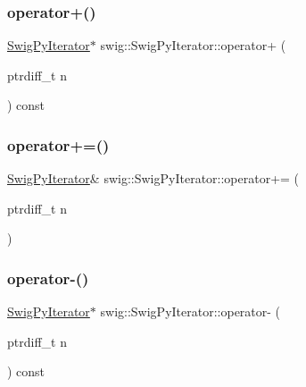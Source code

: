 \subsubsection{\texorpdfstring{operator+()}{operator+()}}
{\footnotesize\ttfamily \hyperlink{structswig_1_1_swig_py_iterator}{Swig\+Py\+Iterator}$\ast$ swig\+::\+Swig\+Py\+Iterator\+::operator+ (\begin{DoxyParamCaption}\item[{ptrdiff\+\_\+t}]{n }\end{DoxyParamCaption}) const\hspace{0.3cm}{\ttfamily [inline]}}

\mbox{\label{structswig_1_1_swig_py_iterator_a81afed8a7dfb6c44a8d31069e44aabc2}} 
\subsubsection{\texorpdfstring{operator+=()}{operator+=()}}
{\footnotesize\ttfamily \hyperlink{structswig_1_1_swig_py_iterator}{Swig\+Py\+Iterator}\& swig\+::\+Swig\+Py\+Iterator\+::operator+= (\begin{DoxyParamCaption}\item[{ptrdiff\+\_\+t}]{n }\end{DoxyParamCaption})\hspace{0.3cm}{\ttfamily [inline]}}

\mbox{\label{structswig_1_1_swig_py_iterator_af41383899796677955b31807fd7ccfd7}} 
\subsubsection{\texorpdfstring{operator-\/()}{operator-()}\hspace{0.1cm}{\footnotesize\ttfamily [1/2]}}
{\footnotesize\ttfamily \hyperlink{structswig_1_1_swig_py_iterator}{Swig\+Py\+Iterator}$\ast$ swig\+::\+Swig\+Py\+Iterator\+::operator-\/ (\begin{DoxyParamCaption}\item[{ptrdiff\+\_\+t}]{n }\end{DoxyParamCaption}) const\hspace{0.3cm}{\ttfamily [inline]}}

